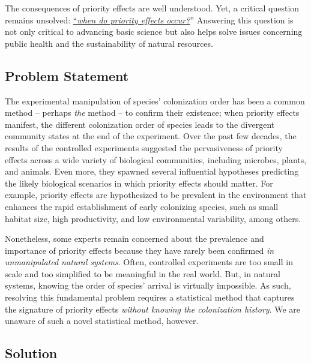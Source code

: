 \documentclass[12pt, class=article, crop=false]{standalone}
\begin{document}
The consequences of priority effects are well understood. Yet, a critical question remains unsolved: \ul{``\textit{when do priority effects occur?}}'' 
Answering this question is not only critical to advancing basic science but also helps solve issues concerning public health and the sustainability of natural resources.

\subsection*{Problem Statement}

The experimental manipulation of species' colonization order has been a common method -- perhaps \textit{the} method -- to confirm their existence; when priority effects manifest, the different colonization order of species leads to the divergent community states at the end of the experiment.
Over the past few decades, the results of the controlled experiments suggested the pervasiveness of priority effects across a wide variety of biological communities, including microbes, plants, and animals.
Even more, they spawned several influential hypotheses predicting the likely biological scenarios in which priority effects should matter.
For example, priority effects are hypothesized to be prevalent in the environment that enhances the rapid establishment of early colonizing species, such as small habitat size, high productivity, and low environmental variability, among others.

Nonetheless, some experts remain concerned about the prevalence and importance of priority effects because they have rarely been confirmed \textit{in unmanipulated natural systems}.
Often, controlled experiments are too small in scale and too simplified to be meaningful in the real world.
But, in natural systems, knowing the order of species' arrival is virtually impossible.
As such, resolving this fundamental problem requires a statistical method that captures the signature of priority effects \textit{without knowing the colonization history}.
We are unaware of such a novel statistical method, however. 

\subsection*{Solution}
\end{document}
